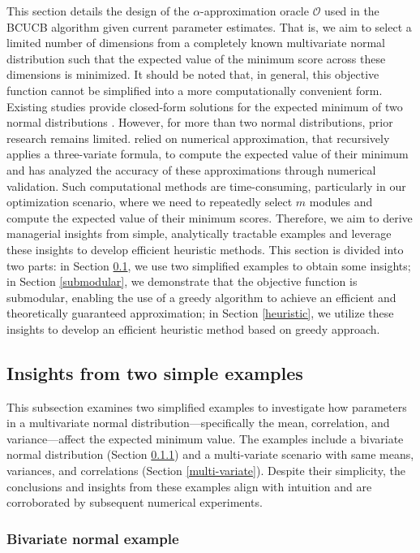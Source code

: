 \documentclass[opre,sglanonrev]{informs4}
\begin{document}
This section details the design of the $\alpha$-approximation oracle $\mathcal{O}$ used in the BCUCB algorithm given current parameter estimates. That is, we aim to select a limited number of dimensions from a completely known multivariate normal distribution such that the expected value of the minimum score across these dimensions is minimized. It should be noted that, in general, this objective function cannot be simplified into a more computationally convenient form. Existing studies provide closed-form solutions for the expected minimum of two normal distributions \citep{nadarajah2008exact}. However, for more than two normal distributions, prior research remains limited. \cite{clark1961greatest} relied on numerical approximation, that recursively applies a three-variate formula, to compute the expected value of their minimum and has analyzed the accuracy of these approximations through numerical validation. Such computational methods are time-consuming, particularly in our optimization scenario, where we need to repeatedly select $m$ modules and compute the expected value of their minimum scores. Therefore, we aim to derive managerial insights from simple, analytically tractable examples and leverage these insights to develop efficient heuristic methods. This section is divided into two parts: in Section \ref{insights}, we use two simplified examples to obtain some insights; in Section \ref{submodular}, we demonstrate that the objective function is submodular, enabling the use of a greedy algorithm to achieve an efficient and theoretically guaranteed approximation; in Section \ref{heuristic}, we utilize these insights to develop an efficient heuristic method based on greedy approach.

\subsection{Insights from two simple examples}
\label{insights}
This subsection examines two simplified examples to investigate how parameters in a multivariate normal distribution—specifically the mean, correlation, and variance—affect the expected minimum value. The examples include a bivariate normal distribution (Section \ref{bivariate normal}) and a multi-variate scenario with same means, variances, and correlations (Section \ref{multi-variate}). Despite their simplicity, the conclusions and insights from these examples align with intuition and are corroborated by subsequent numerical experiments.

\subsubsection{Bivariate normal example}
\label{bivariate normal}
\end{document}
